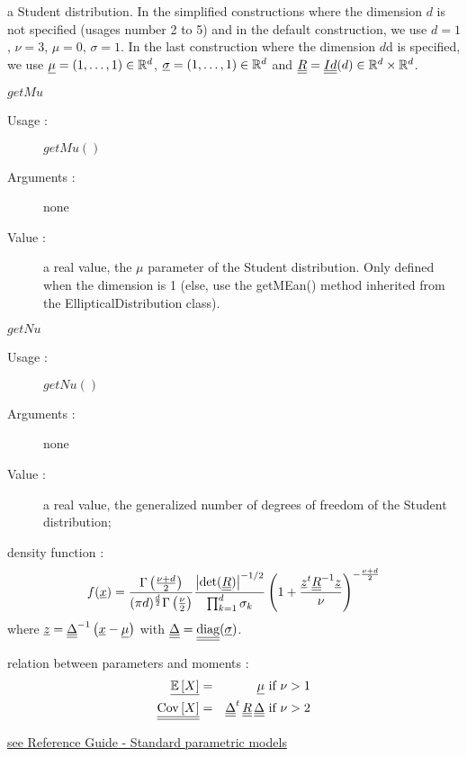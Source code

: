 \begin{description}
\item[Value :] a Student distribution. In the simplified constructions where the dimension $d$ is not specified (usages number 2 to 5) and in the default construction, we use $d=1$, $\nu=3$, $\mu=0$, $\sigma=1$. In the last construction where the dimension $d$d is specified, we use ${\underline{\mu}}= (1, \dots, 1) \in \mathbb{R}^d$, ${\underline{\sigma}}= (1, \dots, 1) \in \mathbb{R}^d$ and ${\underline{\underline{R}}} = {\underline{\underline{Id}}}(d) \in \mathbb{R}^d \times \mathbb{R}^d$.

\item[Some methods :] \rule{0pt}{1em}
  \begin{description}

  \item $getMu$
    \begin{description}
    \item[Usage :] $getMu()$
    \item[Arguments :] none
    \item[Value :]  a real value, the $\mu$ parameter of the Student distribution. Only defined when the dimension is 1 (else, use the getMEan() method inherited from the EllipticalDistribution class).
    \end{description}
    \bigskip
  \item $getNu$
    \begin{description}
    \item[Usage :] $getNu()$
    \item[Arguments :] none
    \item[Value :]  a real value, the generalized number of degrees of freedom of the Student distribution;
    \end{description}
    \bigskip
  \end{description}

\item[Details :]  \rule{0pt}{1em}
  \begin{description}
  \item density function :
    $$
    f({\underline{x}}) = \frac{\Gamma\left(\frac{\nu+d}{2}\right)}
    {(\pi d)^{\frac{d}{2}}\Gamma\left(\frac{\nu}{2}\right)}\frac{\left|\mathrm{det}({\underline{\underline{R}}})\right|^{-1/2}}{\prod_{k=1}^d\sigma_k}\left(1+\frac{{\underline{z}}^t{\underline{\underline{R}}}^{-1}{\underline{z}}}{\nu}\right)^{-\frac{\nu+d}{2}}
    $$
    where ${\underline{z}}={\underline{\underline{\Delta}}}^{-1}\left({\underline{x}}-{\underline{\mu}}\right)$ with ${\underline{\underline{\Delta}}}={\underline{\underline{\mathrm{diag}}}}({\underline{\sigma}})$.
  \item relation between parameters and moments :
    \begin{eqnarray*}
      {\underline{{\mathbb E}\left[ X \right]}} & = & {\underline{\mu}}\mbox{ if }\nu>1\\
      {\underline{\underline{{\rm Cov}\left[ X \right]}}} & = & {\underline{\underline{\Delta}}}^t\,{\underline{\underline{R}}}\,{\underline{\underline{\Delta}}}\mbox{ if }\nu>2
    \end{eqnarray*}
  \end{description}

\item[Links :]  \rule{0pt}{1em}
  \href{OpenTURNS_ReferenceGuide.pdf}{see Reference Guide - Standard parametric models}
\end{description}


